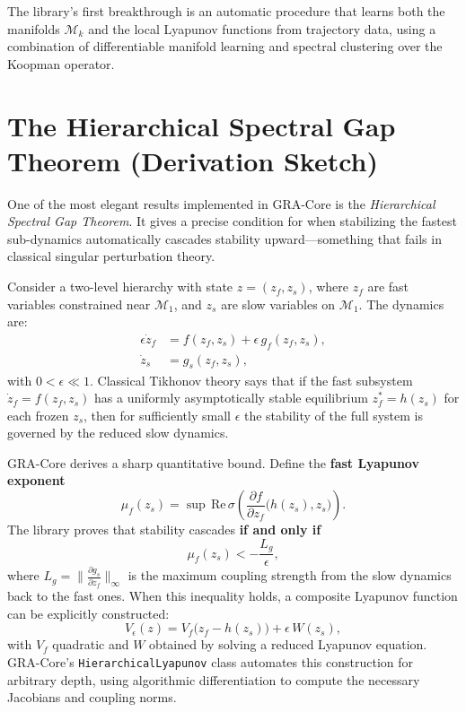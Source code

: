 \documentclass[11pt,a4paper]{article}
\begin{document}
The library's first breakthrough is an automatic procedure that learns both the manifolds $\mathcal{M}_k$ and the local Lyapunov functions from trajectory data, using a combination of differentiable manifold learning and spectral clustering over the Koopman operator.

\section{The Hierarchical Spectral Gap Theorem (Derivation Sketch)}
One of the most elegant results implemented in GRA-Core is the \emph{Hierarchical Spectral Gap Theorem}. It gives a precise condition for when stabilizing the fastest sub-dynamics automatically cascades stability upward---something that fails in classical singular perturbation theory.

Consider a two-level hierarchy with state $z = (z_f, z_s)$, where $z_f$ are fast variables constrained near $\mathcal{M}_1$, and $z_s$ are slow variables on $\mathcal{M}_1$. The dynamics are:
\begin{align}
\epsilon \dot{z}_f &= f(z_f, z_s) + \epsilon\, g_f(z_f, z_s), \label{eq:fast}\\
\dot{z}_s &= g_s(z_f, z_s), \label{eq:slow}
\end{align}
with $0 < \epsilon \ll 1$. Classical Tikhonov theory says that if the fast subsystem $\dot{z}_f = f(z_f, z_s)$ has a uniformly asymptotically stable equilibrium $z_f^* = h(z_s)$ for each frozen $z_s$, then for sufficiently small $\epsilon$ the stability of the full system is governed by the reduced slow dynamics.

GRA-Core derives a sharp quantitative bound. Define the \textbf{fast Lyapunov exponent}
\begin{equation}
\mu_f(z_s) = \sup\, \mathrm{Re}\,\sigma\!\left( \frac{\partial f}{\partial z_f}\bigl(h(z_s), z_s\bigr) \right).
\end{equation}
The library proves that stability cascades \textbf{if and only if}
\begin{equation}
\mu_f(z_s) < -\frac{L_g}{\epsilon},
\end{equation}
where $L_g = \bigl\| \frac{\partial g_s}{\partial z_f} \bigr\|_\infty$ is the maximum coupling strength from the slow dynamics back to the fast ones. When this inequality holds, a composite Lyapunov function can be explicitly constructed:
\begin{equation}
V_\epsilon(z) = V_f\bigl(z_f - h(z_s)\bigr) + \epsilon\, W(z_s),
\end{equation}
with $V_f$ quadratic and $W$ obtained by solving a reduced Lyapunov equation. GRA-Core's \texttt{HierarchicalLyapunov} class automates this construction for arbitrary depth, using algorithmic differentiation to compute the necessary Jacobians and coupling norms.
\end{document}
